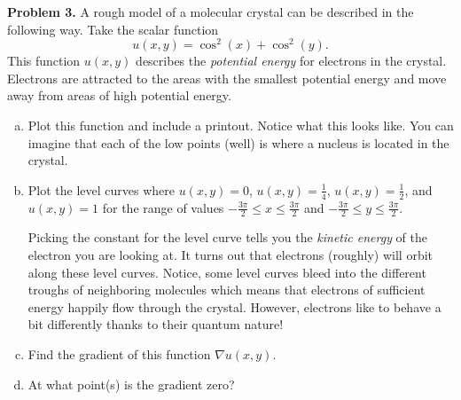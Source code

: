 \documentclass[12pt]{report} %
\theoremstyle{definition}
\begin{document}
\noindent\textbf{Problem 3.} A rough model of a molecular crystal can be described in the following way.  Take the scalar function
\[
u(x,y)=\cos^2(x)+\cos^2(y).
\]
This function $u(x,y)$ describes the \emph{potential energy} for electrons in the crystal. Electrons are attracted to the areas with the smallest potential energy and move away from areas of high potential energy. 
\begin{enumerate}[(a)]
    \item Plot this function and include a printout.  Notice what this looks like.  You can imagine that each of the low points (well) is where a nucleus is located in the crystal.
    \item Plot the level curves where $u(x,y)=0$, $u(x,y)=\frac{1}{4}$, $u(x,y)=\frac{1}{2}$, and $u(x,y)=1$ for the range of values $-\frac{3\pi}{2}\leq x \leq \frac{3\pi}{2}$ and $-\frac{3\pi}{2}\leq y \leq \frac{3\pi}{2}$. 
    
    Picking the constant for the level curve tells you the \emph{kinetic energy} of the electron you are looking at.  It turns out that electrons (roughly) will orbit along these level curves.  Notice, some level curves bleed into the different troughs of neighboring molecules which means that electrons of sufficient energy happily flow through the crystal. However, electrons like to behave a bit differently thanks to their quantum nature!
    \item Find the gradient of this function $\nabla u(x,y)$.
    \item At what point(s) is the gradient zero? 
\end{enumerate}   
\end{document}
